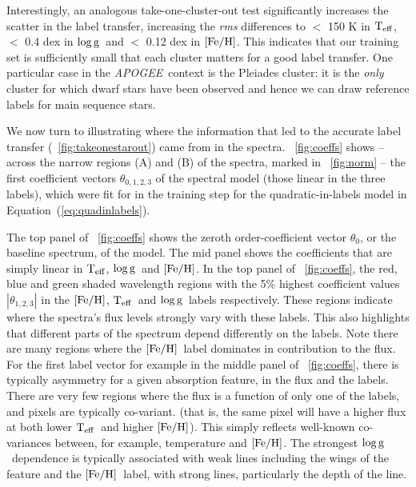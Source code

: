 \documentclass[12pt, preprint]{aastex}
\newcommand{\apogee}{\textsl{APOGEE}}
\newcommand{\teff}{\mbox{$\rm T_{eff}$}}
\newcommand{\feh}{\mbox{$\rm [Fe/H]$}}
\newcommand{\logg}{\mbox{$\rm \log g$}}
\begin{document}
Interestingly, an analogous take-one-cluster-out test significantly increases the scatter in the label transfer, 
increasing the \textit{rms} differences to $<$ 150 K in \teff, $<$ 0.4 dex in \logg\ and $<$ 0.12 dex in \feh.
This indicates that our training set is sufficiently small that each cluster matters for a good label transfer. 
One particular case in the \apogee\ context is the Pleiades cluster: it is the \textit{only} cluster for which dwarf stars have been observed and hence we can draw reference labels for main sequence stars. 


 
We now turn to illustrating where the information that led to the accurate label transfer (\figurename~\ref{fig:takeonestarout}) came from in the spectra.
\figurename~\ref{fig:coeffs} shows -- across the narrow regions (A) and (B) of the spectra, marked in \figurename~\ref{fig:norm} -- the first coefficient vectors $\theta_{0,1,2,3}$ of the spectral model (those linear in the three labels), which were fit for in the training step for the quadratic-in-labels model in Equation~(\ref{eq:quadinlabels}). 


The top panel of \figurename~\ref{fig:coeffs} shows the zeroth order-coefficient vector $\theta_0$, or the baseline spectrum, of the model. 
The mid panel shows the coefficients that are simply linear in \teff, \logg\ and \feh.
In the top panel of \figurename~\ref{fig:coeffs}, the red, blue and green shaded wavelength regions with the 5\% 
highest coefficient values $|\theta_{1,2,3}|$ in the \feh, \teff\ and \logg\ labels respectively. 
These regions indicate where the spectra's flux levels strongly vary with these labels.
This also highlights that different parts of the spectrum depend differently on the labels. Note there are many regions where the \feh\ label dominates in contribution to the flux.
For the first label vector for example in the middle panel of \figurename~\ref{fig:coeffs}, 
there is typically asymmetry for a given absorption feature, in the flux and the labels. 
There are very few regions where the flux is a function of only one of the labels, and pixels are typically co-variant. 
(that is, the same pixel will have a higher flux at both lower \teff\ and higher \feh). 
This simply reflects well-known co-variances between, for example, temperature and \feh .
The strongest \logg\ dependence is typically associated with weak lines including the wings of the 
feature and the \feh\ label, with strong lines, particularly the depth of the line. 
\end{document}
